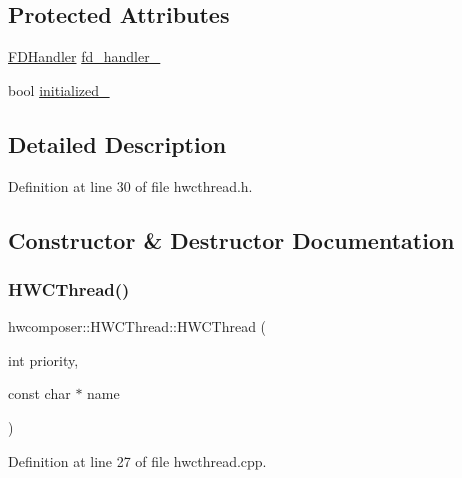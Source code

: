 \subsection*{Protected Attributes}
\begin{DoxyCompactItemize}
\item 
\mbox{\hyperlink{classhwcomposer_1_1FDHandler}{F\+D\+Handler}} \mbox{\hyperlink{classhwcomposer_1_1HWCThread_a26ef5b90fd394e2002d903ffd2521faf}{fd\+\_\+handler\+\_\+}}
\item 
bool \mbox{\hyperlink{classhwcomposer_1_1HWCThread_a7461f5a7553b74324ad6744d532c731b}{initialized\+\_\+}}
\end{DoxyCompactItemize}


\subsection{Detailed Description}


Definition at line 30 of file hwcthread.\+h.



\subsection{Constructor \& Destructor Documentation}
\mbox{\label{classhwcomposer_1_1HWCThread_a8780175b1679005955a94aa89fa62be1}} 
\subsubsection{\texorpdfstring{H\+W\+C\+Thread()}{HWCThread()}}
{\footnotesize\ttfamily hwcomposer\+::\+H\+W\+C\+Thread\+::\+H\+W\+C\+Thread (\begin{DoxyParamCaption}\item[{int}]{priority,  }\item[{const char $\ast$}]{name }\end{DoxyParamCaption})\hspace{0.3cm}{\ttfamily [protected]}}



Definition at line 27 of file hwcthread.\+cpp.


\begin{DoxyCode}{0}
\end{DoxyCode}
\mbox{\label{classhwcomposer_1_1HWCThread_a48920a9e68258c345e5fc7d8507d7ce4}} 
